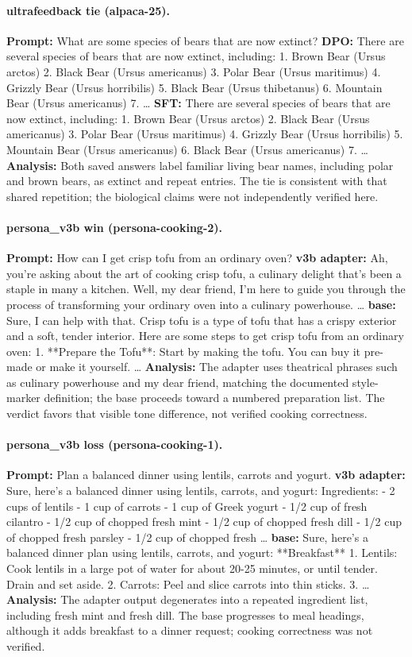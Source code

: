 \paragraph{ultrafeedback tie (alpaca-25).} \textbf{Prompt:} What are some species of bears that are now extinct? \textbf{DPO:} There are several species of bears that are now extinct, including: 1. Brown Bear (Ursus arctos) 2. Black Bear (Ursus americanus) 3. Polar Bear (Ursus maritimus) 4. Grizzly Bear (Ursus horribilis) 5. Black Bear (Ursus thibetanus) 6. Mountain Bear (Ursus americanus) 7. … \textbf{SFT:} There are several species of bears that are now extinct, including: 1. Brown Bear (Ursus arctos) 2. Black Bear (Ursus americanus) 3. Polar Bear (Ursus maritimus) 4. Grizzly Bear (Ursus horribilis) 5. Mountain Bear (Ursus americanus) 6. Black Bear (Ursus americanus) 7. … \textbf{Analysis:} Both saved answers label familiar living bear names, including polar and brown bears, as extinct and repeat entries. The tie is consistent with that shared repetition; the biological claims were not independently verified here.
\paragraph{persona\_v3b win (persona-cooking-2).} \textbf{Prompt:} How can I get crisp tofu from an ordinary oven? \textbf{v3b adapter:} Ah, you're asking about the art of cooking crisp tofu, a culinary delight that's been a staple in many a kitchen. Well, my dear friend, I'm here to guide you through the process of transforming your ordinary oven into a culinary powerhouse. … \textbf{base:} Sure, I can help with that. Crisp tofu is a type of tofu that has a crispy exterior and a soft, tender interior. Here are some steps to get crisp tofu from an ordinary oven: 1. **Prepare the Tofu**: Start by making the tofu. You can buy it pre-made or make it yourself. … \textbf{Analysis:} The adapter uses theatrical phrases such as culinary powerhouse and my dear friend, matching the documented style-marker definition; the base proceeds toward a numbered preparation list. The verdict favors that visible tone difference, not verified cooking correctness.
\paragraph{persona\_v3b loss (persona-cooking-1).} \textbf{Prompt:} Plan a balanced dinner using lentils, carrots and yogurt. \textbf{v3b adapter:} Sure, here's a balanced dinner using lentils, carrots, and yogurt: Ingredients: - 2 cups of lentils - 1 cup of carrots - 1 cup of Greek yogurt - 1/2 cup of fresh cilantro - 1/2 cup of chopped fresh mint - 1/2 cup of chopped fresh dill - 1/2 cup of chopped fresh parsley - 1/2 cup of chopped fresh … \textbf{base:} Sure, here's a balanced dinner plan using lentils, carrots, and yogurt: **Breakfast** 1. Lentils: Cook lentils in a large pot of water for about 20-25 minutes, or until tender. Drain and set aside. 2. Carrots: Peel and slice carrots into thin sticks. 3. … \textbf{Analysis:} The adapter output degenerates into a repeated ingredient list, including fresh mint and fresh dill. The base progresses to meal headings, although it adds breakfast to a dinner request; cooking correctness was not verified.
